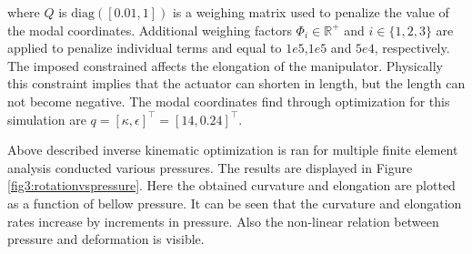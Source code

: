 where $Q$ is $\text{diag}([0.01,1])$ is a weighing matrix used to penalize the value of the modal coordinates. Additional weighing factors $\Phi_i \in \mathbb{R}^+$ and $i \in \{1,2,3\}$ are applied to penalize individual terms and equal to $1e5$,$1e5$ and $5e4$, respectively. The imposed constrained affects the elongation of the manipulator. Physically this constraint implies that the actuator can shorten in length, but the length can not become negative. The modal coordinates find through optimization for this simulation are $q = [\kappa,\epsilon]^\top = [14,0.24]^\top$.


Above described inverse kinematic optimization is ran for multiple finite element analysis conducted various pressures. The results are displayed in Figure \ref{fig3:rotationvspressure}. Here the obtained curvature and elongation are plotted as a function of bellow pressure. It can be seen that the curvature and elongation rates increase by increments in pressure. Also the non-linear relation between pressure and deformation is visible.

